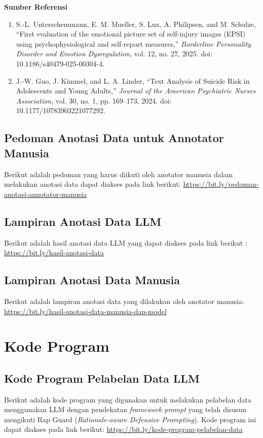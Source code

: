 \textbf{Sumber Referensi}

\begin{enumerate}
    \item S.-L. Unterschemmann, E. M. Mueller, S. Lux, A. Philipsen, and M. Schulze, ``First evaluation of the emotional picture set of self-injury images (EPSI) using psychophysiological and self-report measures,'' \textit{Borderline Personality Disorder and Emotion Dysregulation}, vol. 12, no. 27, 2025. doi: 10.1186/s40479-025-00304-4.

    \item J.-W. Guo, J. Kimmel, and L. A. Linder, ``Text Analysis of Suicide Risk in Adolescents and Young Adults,'' \textit{Journal of the American Psychiatric Nurses Association}, vol. 30, no. 1, pp. 169--173, 2024. doi: 10.1177/10783903221077292.
\end{enumerate}




\subsection{Pedoman Anotasi Data untuk Annotator Manusia}
Berikut adalah pedoman yang harus diikuti oleh anotator manusia dalam melakukan anotasi data dapat diakses pada link berikut: \href{https://bit.ly/pedoman-anotasi-annotator-manusia}{https://bit.ly/pedoman-anotasi-annotator-manusia}

\subsection{Lampiran Anotasi Data LLM}
Berikut adalah hasil anotasi data LLM yang dapat diakses pada link berikut : \href{https://bit.ly/hasil-anotasi-data}{https://bit.ly/hasil-anotasi-data}


\subsection{Lampiran Anotasi Data Manusia}
Berikut adalah lampiran anotasi data yang dilakukan oleh anotator manusia: \href{https://bit.ly/hasil-anotasi-data-manusia-dan-model}{https://bit.ly/hasil-anotasi-data-manusia-dan-model}

\section{Kode Program}
\subsection{Kode Program Pelabelan Data LLM}
Berikut adalah kode program yang digunakan untuk melakukan pelabelan data menggunakan LLM dengan pendekatan \textit{framework prompt} yang telah disusun mengikuti Rap Guard (\textit{Rationale-aware Defensive Prompting}). Kode program ini dapat diakses pada link berikut: \href{https://bit.ly/kode-program-pelabelan-data}{https://bit.ly/kode-program-pelabelan-data}

